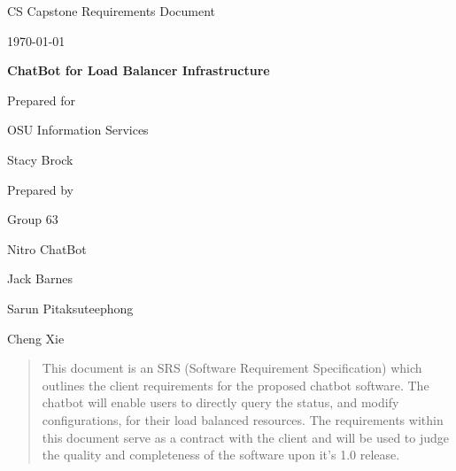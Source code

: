 \documentclass[onecolumn, draftclsnofoot,10pt, compsoc]{IEEEtran}
\def \CapstoneTeamName{		    Nitro ChatBot}
\def \CapstoneTeamNumber{		63}
\def \GroupMemberOne{			Jack Barnes}
\def \GroupMemberTwo{			Sarun Pitaksuteephong}
\def \GroupMemberThree{			Cheng Xie}
\def \CapstoneProjectName{		ChatBot for Load Balancer Infrastructure}
\def \CapstoneSponsorCompany{	OSU Information Services}
\def \CapstoneSponsorPerson{	Stacy Brock}
\def \DocType{	%
				Requirements Document
				}
\newcommand{\NameSigPair}[1]{\par
\makebox[2.75in][r]{#1} \hfil 	\makebox[3.25in]{\makebox[2.25in]{\hrulefill} \hfill		\makebox[.75in]{\hrulefill}}
\par\vspace{-12pt} \textit{\tiny\noindent
\makebox[2.75in]{} \hfil		\makebox[3.25in]{\makebox[2.25in][r]{Signature} \hfill	\makebox[.75in][r]{Date}}}}
\renewcommand{\NameSigPair}[1]{#1}
\begin{document}
\begin{titlepage}
    \begin{singlespace}
        \hfill 
        \par\vspace{.2in}
        \centering
        \scshape{
            \huge CS Capstone \DocType \par
            {\large\today}\par
            \vspace{.5in}
            \textbf{\Huge\CapstoneProjectName}\par
            \vfill
            {\large Prepared for}\par
            \Huge \CapstoneSponsorCompany\par
            \vspace{5pt}
            {\Large\NameSigPair{\CapstoneSponsorPerson}\par}
            {\large Prepared by }\par
            Group\CapstoneTeamNumber\par
            \CapstoneTeamName\par 
            \vspace{5pt}
            {\Large
                \NameSigPair{\GroupMemberOne}\par
                \NameSigPair{\GroupMemberTwo}\par
                \NameSigPair{\GroupMemberThree}\par
            }
            \vspace{20pt}
        }
        \begin{abstract}
            This document is an SRS (Software Requirement Specification) which outlines the client requirements for the proposed chatbot software.
            The chatbot will enable users to directly query the status, and modify configurations, for their load balanced resources.
            The requirements within this document serve as a contract with the client and will be used to judge the quality and completeness of the software upon it's 1.0 release.
        \end{abstract}     
    \end{singlespace}
\end{titlepage}
\newpage
{}
\tableofcontents
\listoffigures
\listoftables
\clearpage
\end{document}
